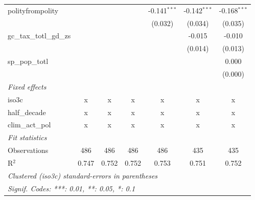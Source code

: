 \begin{tabular}{lcccccc}
   polityfrompolity                                     &               &                &                & -0.141$^{***}$ & -0.142$^{***}$ & -0.168$^{***}$\\   
                                                        &               &                &                & (0.032)        & (0.034)        & (0.035)\\   
   gc\_tax\_totl\_gd\_zs                                &               &                &                &                & -0.015         & -0.010\\   
                                                        &               &                &                &                & (0.014)        & (0.013)\\   
   sp\_pop\_totl                                        &               &                &                &                &                & 0.000\\   
                                                        &               &                &                &                &                & (0.000)\\   
   \emph{Fixed effects}\\
   iso3c                                                & x             & x              & x              & x              & x              & x\\  
   half\_decade                                         & x             & x              & x              & x              & x              & x\\  
   clim\_act\_pol                                       & x             & x              & x              & x              & x              & x\\  
   \midrule \emph{Fit statistics}\\
   Observations                                         & 486           & 486            & 486            & 486            & 435            & 435\\  
   R$^2$                                                & 0.747         & 0.752          & 0.752          & 0.753          & 0.751          & 0.752\\  
   \midrule
   \multicolumn{7}{l}{\emph{Clustered (iso3c) standard-errors in parentheses}}\\
   \multicolumn{7}{l}{\emph{Signif. Codes: ***: 0.01, **: 0.05, *: 0.1}}\\
\end{tabular}
\par\endgroup


